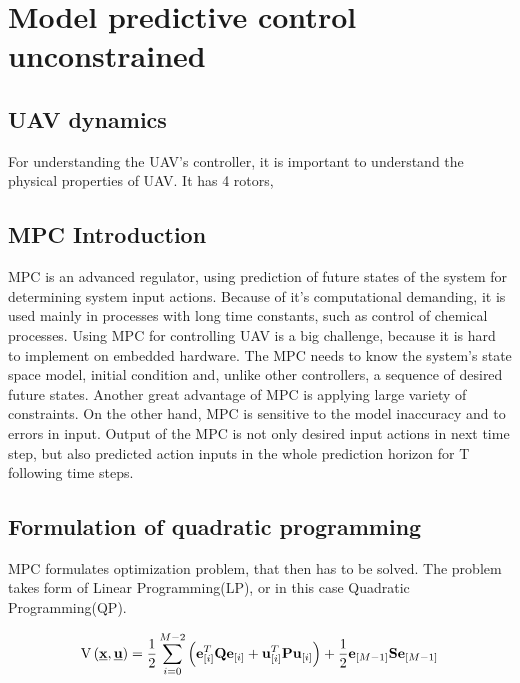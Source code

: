 \documentclass{article}
\begin{document}
\section{Model predictive control unconstrained}

\subsection{UAV dynamics}
For understanding the UAV's controller, it is important to understand the physical properties of UAV. It has 4 rotors, 


\subsection{MPC Introduction}
MPC is an advanced regulator, using prediction of future states of the system for determining system input actions. Because of it's computational demanding, it is used mainly in processes with long time constants, such as control of chemical processes. Using MPC for controlling UAV is a big challenge, because it is hard to implement on embedded hardware. 
The MPC needs to know the system's state space model, initial condition and, unlike other controllers, a sequence of desired future states. Another great advantage of MPC is applying large variety of constraints. On the other hand, MPC is sensitive to the model inaccuracy and to errors in input. Output of the MPC is not only desired input actions in next time step, but also predicted action inputs in the whole prediction horizon for T following time steps. 

\subsection{Formulation of quadratic programming}
MPC formulates optimization problem, that then has to be solved. The problem takes form of Linear Programming(LP), or in this case Quadratic Programming(QP). 

\begin{equation}
\label{eq:QP_formulation}
\begin{split}
\mathrm{V}\left(\textbf{\underline{x}}, \textbf{\underline{u}}\right) = \frac{1}{2}\sum_{i=0}^{M-2}\left(\textbf{e}^T_{[i]}\textbf{Q}\textbf{e}_{[i]} + \textbf{u}^T_{[i]}\textbf{P}\textbf{u}_{[i]}\right) + \frac{1}{2}\textbf{e}_{[M-1]}\textbf{S}\textbf{e}_{[M-1]}
\end{split}
\end{equation}
\end{document}
